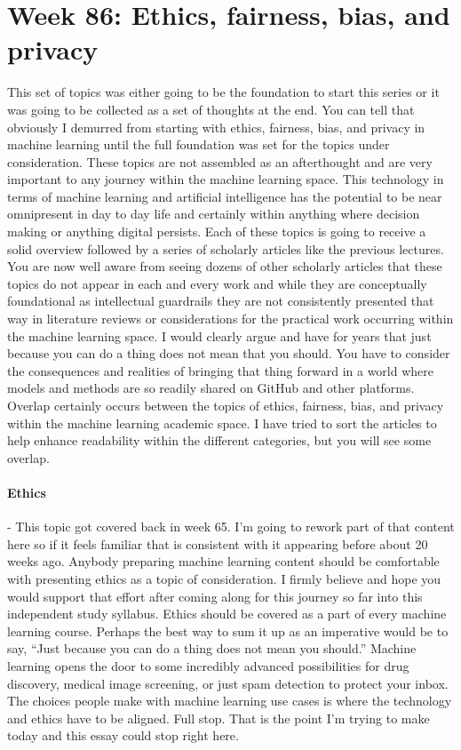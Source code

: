 \documentclass{article}
\begin{document}
\section{Week 86: Ethics, fairness, bias, and privacy}
This set of topics was either going to be the foundation to start this series or it was going to be collected as a set of thoughts at the end. You can tell that obviously I demurred from starting with ethics, fairness, bias, and privacy in machine learning until the full foundation was set for the topics under consideration. These topics are not assembled as an afterthought and are very important to any journey within the machine learning space. This technology in terms of machine learning and artificial intelligence has the potential to be near omnipresent in day to day life and certainly within anything where decision making or anything digital persists. Each of these topics is going to receive a solid overview followed by a series of scholarly articles like the previous lectures. You are now well aware from seeing dozens of other scholarly articles that these topics do not appear in each and every work and while they are conceptually foundational as intellectual guardrails they are not consistently presented that way in literature reviews or considerations for the practical work occurring within the machine learning space. I would clearly argue and have for years that just because you can do a thing does not mean that you should. You have to consider the consequences and realities of bringing that thing forward in a world where models and methods are so readily shared on GitHub and other platforms. 
Overlap certainly occurs between the topics of ethics, fairness, bias, and privacy within the machine learning academic space. I have tried to sort the articles to help enhance readability within the different categories, but you will see some overlap. 

\paragraph{Ethics} - This topic got covered back in week 65. I’m going to rework part of that content here so if it feels familiar that is consistent with it appearing before about 20 weeks ago. Anybody preparing machine learning content should be comfortable with presenting ethics as a topic of consideration. I firmly believe and hope you would support that effort after coming along for this journey so far into this independent study syllabus. Ethics should be covered as a part of every machine learning course. Perhaps the best way to sum it up as an imperative would be to say, “Just because you can do a thing does not mean you should.” Machine learning opens the door to some incredibly advanced possibilities for drug discovery, medical image screening, or just spam detection to protect your inbox. The choices people make with machine learning use cases is where the technology and ethics have to be aligned. Full stop. That is the point I’m trying to make today and this essay could stop right here.
\end{document}
